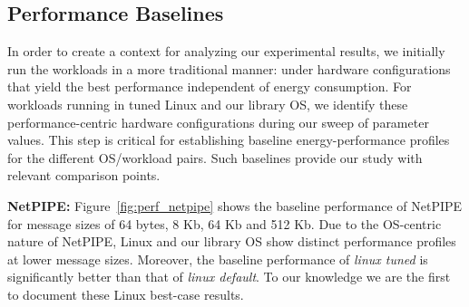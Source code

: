 \subsection{Performance Baselines}
In order to create a context for analyzing our experimental results, we initially run the workloads in a more traditional manner: under hardware configurations that yield the best performance independent of energy consumption. For workloads running in tuned Linux and our library OS, we identify these performance-centric hardware configurations during our sweep of parameter values. This step is critical for establishing baseline energy-performance profiles for the different OS/workload pairs. Such baselines provide our study with relevant comparison points.

\textbf{NetPIPE:} Figure~\ref{fig:perf_netpipe} shows the baseline performance of NetPIPE for message sizes of 64 bytes, 8 Kb, 64 Kb and 512 Kb. Due to the OS-centric nature of NetPIPE, Linux and our library OS show distinct performance profiles at lower message sizes. Moreover, the baseline performance of \textit{linux tuned} is significantly better than that of \textit{linux default}. To our knowledge we are the first to document these Linux best-case results. 




